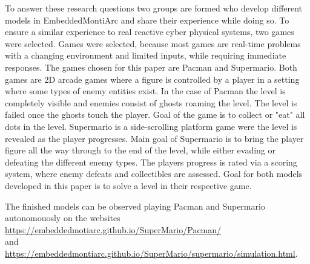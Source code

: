 To answer these research questions two groups are formed who develop different models in EmbeddedMontiArc and share their experience while doing so. To ensure a similar experience to real reactive cyber physical systems, two games were selected.
Games were selected, because most games are real-time problems with a changing environment and limited inputs, while requiring immediate responses.
The games chosen for this paper are Pacman and Supermario.  Both games are 2D arcade games where a figure is controlled by a player in a setting where some types of enemy entities exist. In the case of Pacman the level is completely visible and enemies consist of ghosts roaming the level. The level is failed once the ghosts touch the player. Goal of the game is to collect or "eat" all dots in the level.
Supermario is a side-scrolling platform game were the level is revealed as the player progresses. Main goal of Supermario is to bring the player figure all the way through to the end of the level, while either evading or defeating the different enemy types. The players progress is rated via a scoring system, where enemy defeats and collectibles are assessed.
Goal for both models developed in this paper is to solve a level in their respective game.

The finished models can be observed playing Pacman and Supermario autonomouosly on the websites \\
\url{https://embeddedmotiarc.github.io/SuperMario/Pacman/}\cite{pacmanmodel} \\
and \\
\url{https://embeddedmontiarc.github.io/SuperMario/supermario/simulation.html}\cite{mariomodel}.